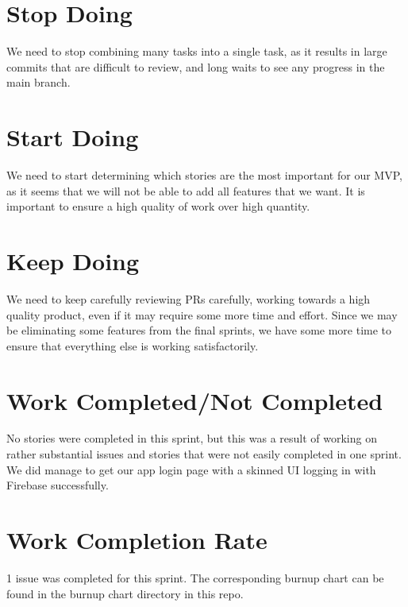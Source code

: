 \documentclass[12pt,letterpaper]{article}
\begin{document}
	\section*{Stop Doing}
		We need to stop combining many tasks into a single task, as it results in large commits that are difficult to review, and long waits to see any progress in the main branch.
	\section*{Start Doing}
		We need to start determining which stories are the most important for our MVP, as it seems that we will not be able to add all features that we want. 
It is important to ensure a high quality of work over high quantity.
	\section*{Keep Doing}
		We need to keep carefully reviewing PRs carefully, working towards a high quality product, even if it may require some more time and effort. Since we may be eliminating some features from the final sprints, we have some more time to ensure that everything else is working satisfactorily.
	\section*{Work Completed/Not Completed}
		No stories were completed in this sprint, but this was a result of working on rather substantial issues and stories that were not easily completed in one sprint.
We did manage to get our app login page with a skinned UI logging in with Firebase successfully.
	\section*{Work Completion Rate}
		1 issue was completed for this sprint. The corresponding burnup chart can be found in the burnup chart directory in this repo.
\end{document}
